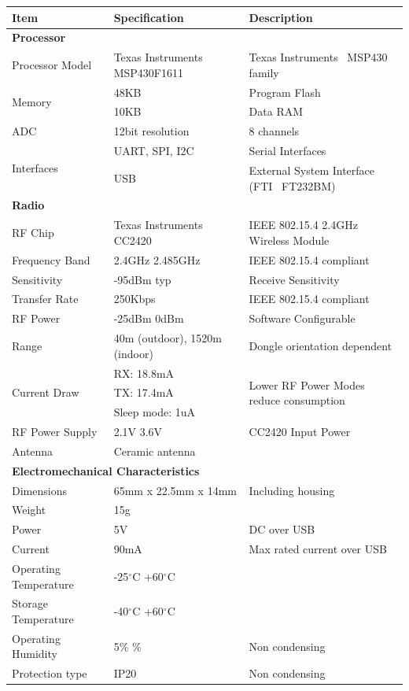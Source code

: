 \begin{table}[H]
	\centering
	\begin{tabularx}{\linewidth}{| l | l | X |}
	\hline
	\textbf{Item} & \textbf{Specification} & \textbf{Description} \\
	\hline
	\hline

	\multicolumn{3}{|l|}{\textbf{Processor}} \\
	\hline
	Processor Model & Texas Instruments\textregistered~ MSP430F1611 & Texas Instruments\textregistered~ MSP430 family\\
	\hline
	\multirow{2}{*}{Memory} & 48KB & Program Flash \\
	~ & 10KB & Data RAM \\
	\hline
	ADC & 12bit resolution & 8 channels \\
	\hline
	\multirow{2}{*}{Interfaces} & UART, SPI, I2C & Serial Interfaces \\
	~ & USB & External System Interface (FTI\textregistered~ FT232BM) \\
	\hline
	\hline

	\multicolumn{3}{|l|}{\textbf{Radio}} \\
	\hline
	RF Chip & Texas Instruments\textregistered~ CC2420 & IEEE 802.15.4 2.4GHz Wireless Module\\
	\hline
	 Frequency Band & 2.4GHz \mytilde 2.485GHz & IEEE 802.15.4 compliant \\
	\hline
	Sensitivity & -95dBm typ & Receive Sensitivity \\
	\hline
	Transfer Rate & 250Kbps & IEEE 802.15.4 compliant \\
	\hline
	RF Power & -25dBm \mytilde 0dBm & Software Configurable \\
	\hline
	Range & \mytilde40m (outdoor), 15\mytilde20m (indoor) & Dongle orientation dependent \\
	\hline
	\multirow{3}{*}{Current Draw} & RX: 18.8mA & \multirow{3}{4.5cm}{Lower RF Power Modes reduce consumption} \\
	~ & TX: 17.4mA & ~ \\
	~ & Sleep mode: 1uA & ~ \\
	\hline
	RF Power Supply & 2.1V \mytilde 3.6V & CC2420 Input Power \\
	\hline
	Antenna & Ceramic antenna & ~ \\
	\hline
	\hline

	\multicolumn{3}{|l|}{\textbf{Electromechanical Characteristics}} \\
	\hline
	Dimensions & 65mm x 22.5mm x 14mm & Including housing\\
	\hline
	Weight & 15g & ~\\
	\hline
	Power & 5V  & DC over USB\\
	\hline
	Current & 90mA  & Max rated current over USB\\
	\hline
	Operating Temperature & -25$^\circ$C \mytilde +60$^\circ$C & ~\\
	\hline
	Storage Temperature & -40$^\circ$C \mytilde +60$^\circ$C & ~\\
	\hline
	Operating Humidity & 5\% \mytilde 95\% & Non condensing\\
	\hline
	Protection type & IP20 & Non condensing\\
	\hline


\end{tabularx}
\end{table}
